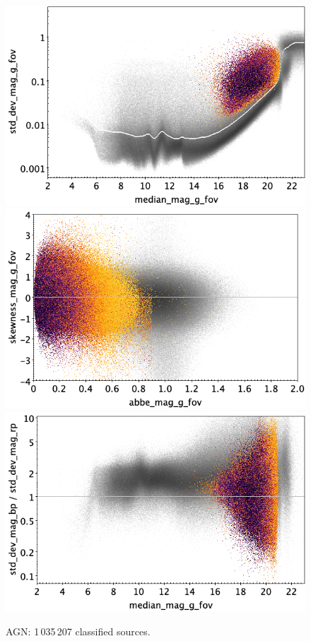 \documentclass[longauth]{aa}
\begin{document}
\begin{appendix}
\begin{figure}
\hspace{2mm}
 \includegraphics[width=0.45\hsize]{figures/appendix/AGN_cls_msd.png} \\ %
\vspace{4mm}
 \includegraphics[width=0.45\hsize]{figures/appendix/AGN_cls_ask.png}  %
\hspace{2mm}
 \includegraphics[width=0.45\hsize]{figures/appendix/AGN_cls_msdr.png}  \\ %
\vspace{4mm}
 \caption{AGN: 1\,035\,207 classified sources.}  
 \label{fig:app:AGN}
\end{figure}


\end{appendix}
\end{document}
